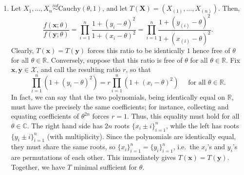 \documentclass[11pt]{article}
\newcommand{\R}{\mathbb{R}}
\newcommand{\C}{\mathbb{C}}
\begin{document}
\begin{enumerate}
\begin{enumerate}
            \item Let $X_1, \dots, X_n \overset{iid}{\sim}
            \text{Cauchy}(\theta, 1)$, and let $T(\bm{X}) = (X_{(1)}, \dots,
            X_{(n)})$.
            Then, \[
                \frac{f(\bm{x}; \theta)}{f(\bm{y}; \theta)}
                    = \prod_{i = 1}^n \frac{1 + (y_i - \theta)^2}{1 + (x_i - \theta)^2}
                    = \prod_{i = 1}^n \frac{1 + (y_{(i)} - \theta)^2}{1 + (x_{(i)} - \theta)^2}.
            \] Clearly, $T(\bm{x}) = T(\bm{y})$ forces this ratio to be
            identically $1$ hence free of $\theta$ for all $\theta \in \R$.
            Conversely, suppose that this ratio is free of $\theta$ for all
            $\theta \in \R$.
            Fix $\bm{x}, \bm{y} \in \mathcal{X}$, and call the resulting ratio
            $r$, so that \[
                \prod_{i = 1}^n (1 + (y_i - \theta)^2) = r \prod_{i = 1}^n (1 + (x_i - \theta)^2) \quad\text{ for all }\theta \in \R.
            \] In fact, we can say that the two polynomials, being identically
            equal on $\R$, must have the precisely the same coefficients; for
            instance, collecting and equating coefficients of $\theta^{2n}$
            forces $r = 1$.
            Thus, this equality must hold for all $\theta \in \C$.
            The right hand side has $2n$ roots $\{x_i \pm i\}_{i = 1}^n$,
            while the left has roots $\{y_i \pm i\}_{i = 1}^n$ (with
            multiplicity).
            Since the polynomials are identically equal, they must share the
            same roots, so $\{x_i\}_{i = 1}^n = \{y_i\}_{i = 1}^n$, i.e.\ the
            $x_i$'s and $y_i$'s are permutations of each other.
            This immediately gives $T(\bm{x}) = T(\bm{y})$.
            Together, we have $T$ minimal sufficient for $\theta$.




\end{enumerate}
\end{enumerate}
\end{document}
